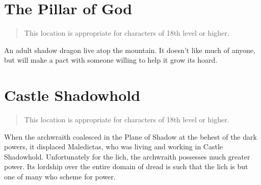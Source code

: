 \section{The Pillar of God} \label{loc:pillarofgod}

\begin{quote}
  This location is appropriate for characters of 18th level or higher.
\end{quote}

An adult shadow dragon live atop the mountain. It doesn't like much of anyone, but
will make a pact with someone willing to help it grow its hoard.

\section{Castle Shadowhold} \label{loc:shadowhold}

\begin{quote}
  This location is appropriate for characters of 18th level or higher.
\end{quote}

When the archwraith coalesced in the Plane of Shadow at the behest of the dark powers,
it displaced Maledictas, who was living and working in Castle Shadowhold. Unfortunately
for the lich, the archwraith possesses much greater power. Its lordship over the
entire domain of dread is such that the lich is but one of many who scheme for power.
